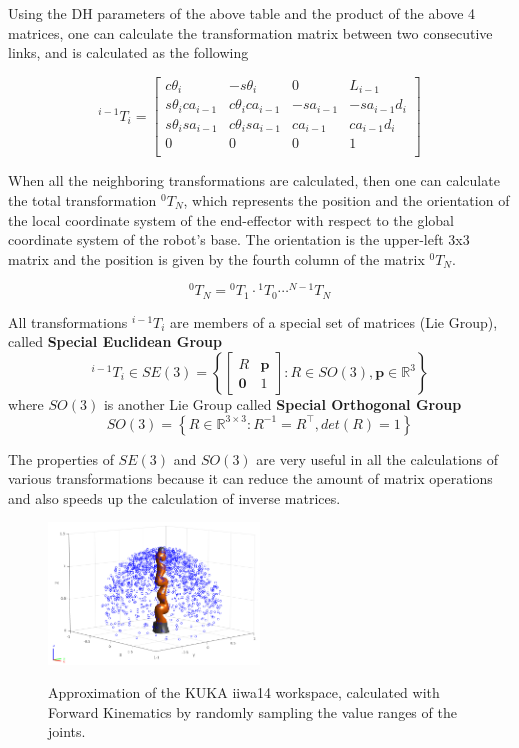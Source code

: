 Using the DH parameters of the above table and the product of the above 4 matrices, one can calculate the transformation matrix between two consecutive links, and is calculated as the following

\begin{equation}
^{i-1}T_i = 
\begin{bmatrix}
c\theta_i & -s\theta_i & 0 & L_{i-1} \\
s\theta_ica_{i-1} & c\theta_ica_{i-1} & -sa_{i-1} & -sa_{i-1}d_i \\
s\theta_isa_{i-1} & c\theta_isa_{i-1} & ca_{i-1} & ca_{i-1}d_i \\
0 & 0 & 0 & 1\\
\end{bmatrix}
\end{equation}

When all the neighboring transformations are calculated, then one can calculate the total transformation $^{0}T_N$, which represents the position and the 
orientation of the local coordinate system of the end-effector with respect to the global coordinate system of the robot's base. The orientation is the 
upper-left 3x3 matrix and the position is given by the fourth column of the matrix $^{0}T_N$.

\begin{equation}
^{0}T_N = {}^{0}T_1 \cdot {}^{1}T_0 \cdots {}^{N-1}T_N
\end{equation}

All transformations $^{i-1}T_i$ are members of a special set of matrices (Lie Group), called \textbf{Special Euclidean Group}
\[
^{i-1}T_i \in SE(3) = \left\lbrace \begin{bmatrix}
R & \mathbf{p}\\
\mathbf{0} & 1
\end{bmatrix} : R \in SO(3), \mathbf{p} \in \mathbb{R}^{3} \right\rbrace
\]
where $SO(3)$ is another Lie Group called \textbf{Special Orthogonal Group}
\[
SO(3) = \left\lbrace R \in \mathbb{R}^{3 \times 3}: R^{-1}=R^\top, det(R)=1 \right\rbrace
\]

The properties of $SE(3)$ and $SO(3)$ are very useful in all the calculations of various transformations because it can reduce the amount of matrix operations and also speeds up the calculation 
of inverse matrices.

\begin{center}
\begin{figure}[H]
\centering
\includegraphics[width=0.5\textwidth]{images/workspace_sampling_1e3.png}\\
\caption{Approximation of the KUKA iiwa14 workspace, calculated with Forward Kinematics by randomly sampling the value ranges of the joints.}
\end{figure}
\end{center}

